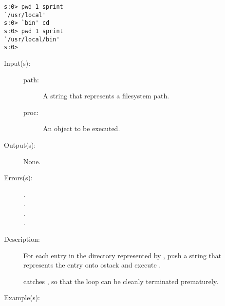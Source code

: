\begin{description}
\begin{description}
\begin{verbatim}
s:0> pwd 1 sprint
`/usr/local'
s:0> `bin' cd
s:0> pwd 1 sprint
`/usr/local/bin'
s:0>
		\end{verbatim}
	\end{description}
\label{systemdict:dirforeach}
\item[{\onyxop{path proc}{dirforeach}{--}}: ]
	\begin{description}\item[]
	\item[Input(s): ]
		\begin{description}\item[]
		\item[path: ]
			A string that represents a filesystem path.
		\item[proc: ]
			An object to be executed.
		\end{description}
	\item[Output(s): ] None.
	\item[Errors(s): ]
		\begin{description}\item[]
		\item[.]
		\item[.]
		\item[.]
		\item[.]
		\end{description}
	\item[Description: ]
		For each entry in the directory represented by ,
		push a string that represents the entry onto ostack and
		execute .

		 catches , so that the
		loop can be cleanly terminated prematurely.
	\item[Example(s): ]\begin{verbatim}


\end{verbatim}
\end{description}
\end{description}
